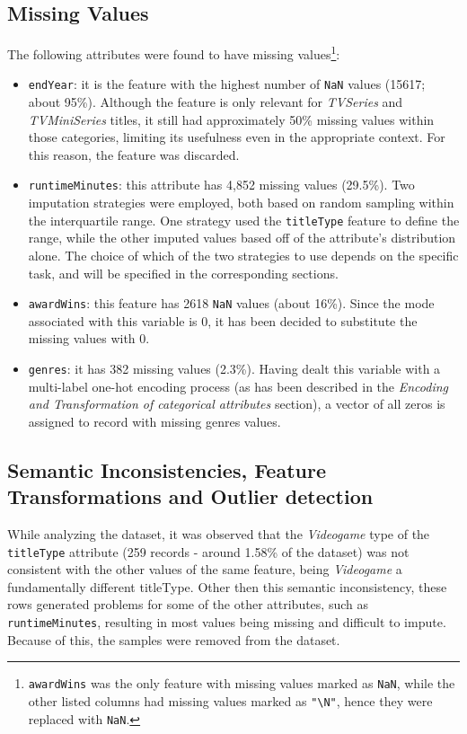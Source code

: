 \subsection{Missing Values}\label{sec:missing_values}
The following attributes were found to have missing values\footnote{\texttt{awardWins}
was the only feature with missing values marked as \texttt{NaN}, while the other listed columns had missing
values marked as \texttt{"\textbackslash N"}, hence they were replaced with \texttt{NaN}.}:
\begin{itemize}
    \item \texttt{endYear}: it is the feature with the highest number of \texttt{NaN} values (15617; about 95\%).
    Although the feature is only relevant for \textit{TVSeries} and \textit{TVMiniSeries} titles, it still
    had approximately 50\% missing values within those categories, limiting its usefulness even in the
    appropriate context. For this reason, the feature was discarded.
    
    \item \texttt{runtimeMinutes}: this attribute has 4,852 missing values (29.5\%). Two imputation strategies were employed, both based on random sampling within the interquartile range. 
    One strategy used the \texttt{titleType} feature to define the range, while the other imputed values based off of the attribute's distribution alone. 
    The choice of which of the two strategies to use depends on the specific task, and will be specified in the corresponding sections.
    
    \item \texttt{awardWins}: this feature has 2618 \texttt{NaN} values (about 16\%).
    Since the mode associated with this variable is 0, it has been decided to substitute the missing
    values with 0.

    \item \texttt{genres}: it has 382 missing values (2.3\%). Having dealt this variable with a
    multi-label one-hot encoding process (as has been described in the \textit{Encoding and Transformation of categorical attributes}
    section), a vector of all zeros is assigned to record with missing genres values.
\end{itemize}



\subsection{Semantic Inconsistencies, Feature Transformations and Outlier detection}
While analyzing the dataset, it was observed that the \textit{Videogame} type of the \texttt{titleType} attribute (259 records - around 1.58\% of the dataset) 
was not consistent with the other values of the same feature, being \textit{Videogame} a fundamentally different titleType.
Other then this semantic inconsistency, these rows generated problems for some of the other attributes, such as \texttt{runtimeMinutes}, resulting in most values being missing and difficult to impute. 
Because of this, the samples were removed from the dataset. \\


